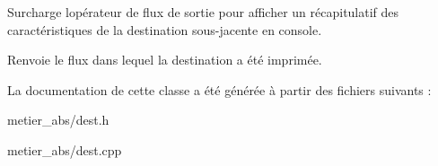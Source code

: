 Surcharge l\textquotesingle{}opérateur de flux de sortie pour afficher un récapitulatif des caractéristiques de la destination sous-\/jacente en console. \begin{DoxyReturn}{Renvoie}
le flux dans lequel la destination a été imprimée. 
\end{DoxyReturn}


La documentation de cette classe a été générée à partir des fichiers suivants \+:\begin{DoxyCompactItemize}
\item 
metier\+\_\+abs/dest.\+h\item 
metier\+\_\+abs/dest.\+cpp\end{DoxyCompactItemize}
